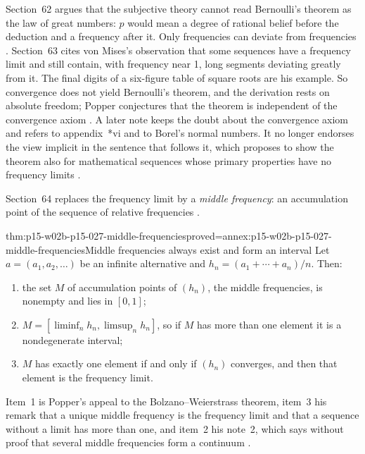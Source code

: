 Section~62 argues that the subjective theory cannot read Bernoulli's
theorem as the law of great numbers: \(p\) would mean a degree of
rational belief before the deduction and a frequency after it. Only
frequencies can deviate from frequencies
\parencite[\S62 and note~*1]{Popper2002LogicDiscoveryUI}.
Section~63 cites von Mises's observation that some sequences have a
frequency limit and still contain, with frequency near 1, long segments
deviating greatly from it. The final digits of a six-figure table of
square roots are his example. So convergence does not yield Bernoulli's
theorem, and the derivation rests on absolute freedom; Popper conjectures
that the theorem is independent of the convergence axiom
\parencite[\S63 and note~1]{Popper2002LogicDiscoveryUI}. A later note
keeps the doubt about the convergence axiom and refers to appendix~*vi
and to Borel's normal numbers. It no longer endorses the view implicit in the sentence that follows
it, which proposes to show the theorem also for mathematical sequences
whose primary properties have no frequency limits
\parencite[\S63, note~*1]{Popper2002LogicDiscoveryUI}.

Section~64 replaces the frequency limit by a \emph{middle frequency}: an
accumulation point of the sequence of relative frequencies
\parencite[\S64]{Popper2002LogicDiscoveryUI}.

\begin{hbtheorem}{thm:p15-w02b-p15-027-middle-frequencies}{proved=annex:p15-w02b-p15-027-middle-frequencies}{Middle frequencies always exist and form an interval}
Let \(a=(a_1,a_2,\ldots)\) be an infinite alternative and
\(h_n=(a_1+\cdots+a_n)/n\). Then:
\begin{enumerate}
\item the set \(M\) of accumulation points of \((h_n)\), the middle
  frequencies, is nonempty and lies in \([0,1]\);
\item \(M=[\liminf_n h_n,\limsup_n h_n]\), so if \(M\) has more than one
  element it is a nondegenerate interval;
\item \(M\) has exactly one element if and only if \((h_n)\) converges,
  and then that element is the frequency limit.
\end{enumerate}
\end{hbtheorem}

Item~1 is Popper's appeal to the Bolzano--Weierstrass theorem, item~3
his remark that a unique middle frequency is the frequency limit and
that a sequence without a limit has more than one, and item~2 his
note~2, which says without proof that several middle frequencies form a
continuum \parencite[\S64 and note~2]{Popper2002LogicDiscoveryUI}.

